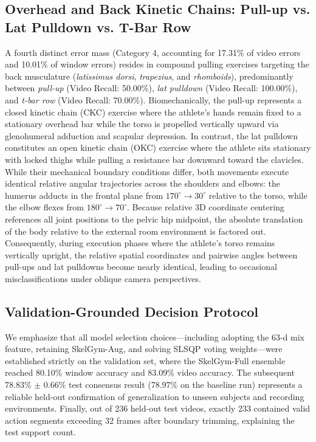 \documentclass[runningheads]{llncs}
\begin{document}
\subsection{Overhead and Back Kinetic Chains: Pull-up vs. Lat Pulldown vs. T-Bar Row}
A fourth distinct error mass (Category 4, accounting for 17.31\% of video errors and 10.01\% of window errors) resides in compound pulling exercises targeting the back musculature (\textit{latissimus dorsi}, \textit{trapezius}, and \textit{rhomboids}), predominantly between \textit{pull-up} (Video Recall: 50.00\%), \textit{lat pulldown} (Video Recall: 100.00\%), and \textit{t-bar row} (Video Recall: 70.00\%).
Biomechanically, the pull-up represents a closed kinetic chain (CKC) exercise where the athlete's hands remain fixed to a stationary overhead bar while the torso is propelled vertically upward via glenohumeral adduction and scapular depression. In contrast, the lat pulldown constitutes an open kinetic chain (OKC) exercise where the athlete sits stationary with locked thighs while pulling a resistance bar downward toward the clavicles. While their mechanical boundary conditions differ, both movements execute identical relative angular trajectories across the shoulders and elbows: the humerus adducts in the frontal plane from $170^\circ \to 30^\circ$ relative to the torso, while the elbow flexes from $180^\circ \to 70^\circ$. Because relative 3D coordinate centering references all joint positions to the pelvic hip midpoint, the absolute translation of the body relative to the external room environment is factored out. Consequently, during execution phases where the athlete's torso remains vertically upright, the relative spatial coordinates and pairwise angles between pull-ups and lat pulldowns become nearly identical, leading to occasional misclassifications under oblique camera perspectives.

\subsection{Validation-Grounded Decision Protocol}\label{sec:val_protocol}
We emphasize that all model selection choices---including adopting the 63-d mix feature, retaining SkelGym-Aug, and solving SLSQP voting weights---were established strictly on the validation set, where the SkelGym-Full ensemble reached 80.10\% window accuracy and 83.09\% video accuracy. The subsequent 78.83\% $\pm$ 0.66\% test consensus result (78.97\% on the baseline run) represents a reliable held-out confirmation of generalization to unseen subjects and recording environments. Finally, out of 236 held-out test videos, exactly 233 contained valid action segments exceeding 32 frames after boundary trimming, explaining the test support count.
\end{document}
